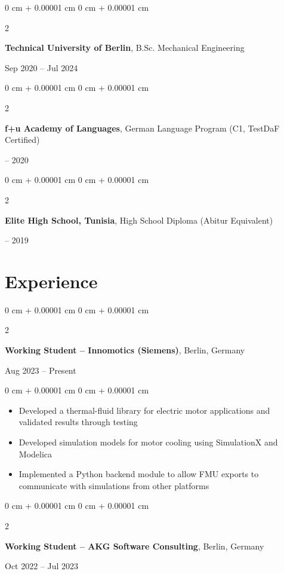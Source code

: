 \documentclass[10pt, letterpaper]{article}
\newenvironment{highlights}{
    \begin{itemize}[
        topsep=0.10 cm,
        parsep=0.10 cm,
        partopsep=0pt,
        itemsep=0pt,
        leftmargin=0 cm + 10pt
    ]
}{
    \end{itemize}
} %
\newenvironment{onecolentry}{
    \begin{adjustwidth}{
        0 cm + 0.00001 cm
    }{
        0 cm + 0.00001 cm
    }
}{
    \end{adjustwidth}
} %
\newenvironment{twocolentry}[2][]{
    \onecolentry
    \def\secondColumn{#2}
    \setcolumnwidth{\fill, 4.5 cm}
    \begin{paracol}{2}
}{
    \switchcolumn \raggedleft \secondColumn
    \end{paracol}
    \endonecolentry
} %
\begin{document}
\begin{twocolentry}{
    Sep 2020 – Jul 2024
}
    \textbf{Technical University of Berlin}, B.Sc. Mechanical Engineering
\end{twocolentry}

\vspace{0.05 cm}

\begin{twocolentry}{
    2019 – 2020
}
    \textbf{f+u Academy of Languages}, German Language Program (C1, TestDaF Certified)
\end{twocolentry}

\vspace{0.05 cm}

\begin{twocolentry}{
    2015 – 2019
}
    \textbf{Elite High School, Tunisia}, High School Diploma (Abitur Equivalent)
\end{twocolentry}
    \vspace{-0.35cm}

\section{Experience}

\small %

\begin{twocolentry}{
    Aug 2023 – Present
}
    \textbf{Working Student – Innomotics (Siemens)}, Berlin, Germany
\end{twocolentry}

\begin{onecolentry}
    \begin{highlights}
        \setlength\itemsep{0pt} %
        \setlength\parsep{0pt}
        \item Developed a thermal-fluid library for electric motor applications and validated results through testing
        \item Developed simulation models for motor cooling using SimulationX and Modelica
        \item Implemented a Python backend module to allow FMU exports to communicate with simulations from other platforms
    \end{highlights}
\end{onecolentry}

\vspace{0.1cm} %

\begin{twocolentry}{
    Oct 2022 – Jul 2023
}
    \textbf{Working Student – AKG Software Consulting}, Berlin, Germany
\end{twocolentry}
\end{document}
